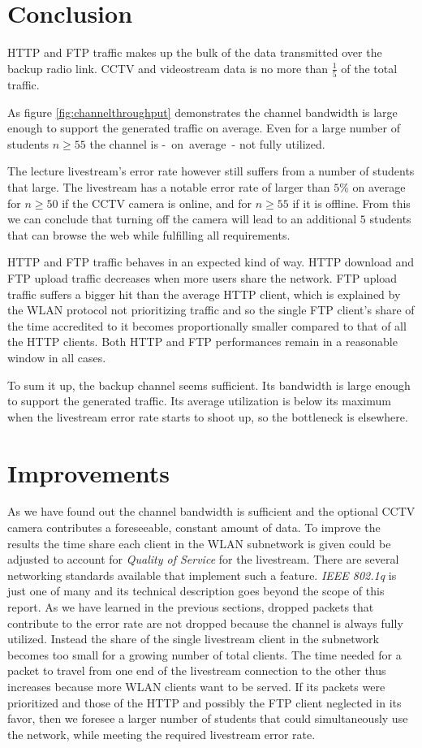 \documentclass[a4paper]{scrreprt}
\begin{document}
		 \section{Conclusion}
		 	HTTP and FTP traffic makes up the bulk of the data transmitted over the backup radio link. CCTV and videostream data is no more than $\frac{1}{5}$ of the total traffic. 
		 	
		 	As figure \ref{fig:channelthroughput} demonstrates the channel bandwidth is large enough to support the generated traffic on average. Even for a large number of students $n\geq 55$ the channel is -~on~average~- not fully utilized. 
		 	
		 	The lecture livestream's error rate however still suffers from a number of students that large. The livestream has a notable error rate of larger than $5\%$ on average for $n\geq 50$ if the CCTV camera is online, and for $n\geq 55$ if it is offline. From this we can conclude that turning off the camera will lead to an additional $5$ students that can browse the web while fulfilling all requirements.
		 	
		 	HTTP and FTP traffic behaves in an expected kind of way. HTTP download and FTP upload traffic decreases when more users share the network. FTP upload traffic suffers a bigger hit than the average HTTP client, which is explained by the WLAN protocol not prioritizing traffic and so the single FTP client's share of the time accredited to it becomes proportionally smaller compared to that of all the HTTP clients. Both HTTP and FTP performances remain in a reasonable window in all cases.		 			 	
		 	
		 	To sum it up, the backup channel seems sufficient. Its bandwidth is large enough to support the generated traffic. Its average utilization is below its maximum when the livestream error rate starts to shoot up, so the bottleneck is elsewhere.
		 	
		 \section{Improvements}
		 	As we have found out the channel bandwidth is sufficient and the optional CCTV camera contributes a foreseeable, constant amount of data. To improve the results the time share each client in the WLAN subnetwork is given could be adjusted to account for \emph{Quality of Service} for the livestream. There are several networking standards available that implement such a feature. \emph{IEEE 802.1q} is just one of many and its technical description goes beyond the scope of this report. As we have learned in the previous sections, dropped packets that contribute to the error rate are not dropped because the channel is always fully utilized. Instead the share of the single livestream client in the subnetwork becomes too small for a growing number of total clients. The time needed for a packet to travel from one end of the livestream connection to the other thus increases because more WLAN clients want to be served. If its packets were prioritized and those of the HTTP and possibly the FTP client neglected in its favor, then we foresee a larger number of students that could simultaneously use the network, while meeting the required livestream error rate.
\end{document}
